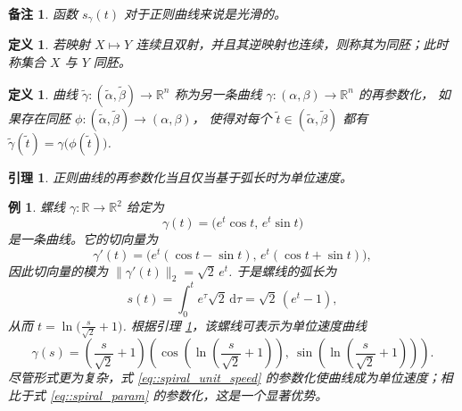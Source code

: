 \documentclass[a4paper]{ctexart}
\newtheorem{remark}{备注}
\newtheorem{definition}[theorem]{定义} %
\newtheorem{lemma}[theorem]{引理}
\newtheorem{example}[theorem]{例}
\numberwithin{theorem}{section}
\numberwithin{equation}{section}
\numberwithin{figure}{section}
\numberwithin{remark}{section}
\begin{document}
\begin{remark}
函数 $s_\gamma(t)$ 对于正则曲线来说是光滑的。
\end{remark}

\begin{definition}
    \label{def::homeomorphism}
若映射 $X\mapsto Y$ 连续且双射，并且其逆映射也连续，则称其为同胚；此时称集合 $X$ 与 $Y$ 同胚。
\end{definition}

\begin{definition}
    \label{def::reparam}
曲线 $\tilde{\gamma}:(\tilde{\alpha},\tilde{\beta})\to\mathbb{R}^{n}$ 
称为另一条曲线 $\gamma:(\alpha,\beta)\to\mathbb{R}^{n}$ 的再参数化，
如果存在同胚 $\phi:(\tilde{\alpha},\tilde{\beta})\to(\alpha,\beta)$，
使得对每个 $\tilde{t}\in(\tilde{\alpha},\tilde{\beta})$ 都有
$\tilde{\gamma}(\tilde{t})=\gamma\bigl(\phi(\tilde{t})\bigr)$.
\end{definition}

\begin{lemma}
    \label{lem::unit_speed_iff_arclength}
正则曲线的再参数化当且仅当基于弧长时为单位速度。
\end{lemma}

\begin{example}
    \label{ex::spiral}
螺线 $\gamma:\mathbb{R}\to\mathbb{R}^{2}$ 给定为
\begin{equation}
    \label{eq::spiral_param} 
\gamma(t)=\bigl(e^{t}\cos t,\, e^{t}\sin t\bigr)
\end{equation}
是一条曲线。它的切向量为
\begin{equation}
    \label{eq::spiral_tangent} 
\gamma'(t)=\bigl(e^{t}(\cos t-\sin t),\, e^{t}(\cos t+\sin t)\bigr),
\end{equation}
因此切向量的模为
$\lVert\gamma'(t)\rVert_{2}=\sqrt{2}\,e^{t}$.
于是螺线的弧长为
\begin{equation}
    \label{eq::spiral_arclength} 
s(t)=\int_{0}^{t}e^{\tau}\sqrt{2}\,\mathrm{d}\tau=\sqrt{2}\,(e^{t}-1),
\end{equation}
从而 $t=\ln\!\bigl(\tfrac{s}{\sqrt{2}}+1\bigr)$. 
根据引理 \ref{lem::unit_speed_iff_arclength}，该螺线可表示为单位速度曲线
\begin{equation}
    \label{eq::spiral_unit_speed} 
\gamma(s)=\left(\frac{s}{\sqrt{2}}+1\right)
\left(\cos\!\left(\ln\!\left(\frac{s}{\sqrt{2}}+1\right)\right),
\ \sin\!\left(\ln\!\left(\frac{s}{\sqrt{2}}+1\right)\right)\right).
\end{equation}
尽管形式更为复杂，式 \eqref{eq::spiral_unit_speed} 的参数化使曲线成为单位速度；相比于式 \eqref{eq::spiral_param} 的参数化，这是一个显著优势。
\end{example}
\end{document}

